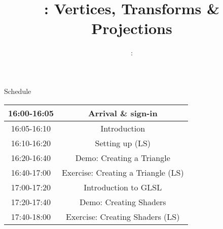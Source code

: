\usepackage{../../beamerthemeFalmouthGamesAcademy}
\usepackage{multimedia}
\graphicspath{ {../../} }




\usepackage[normalem]{ulem}
\usepackage{wasysym}

\usepackage{pdfpages}

\usetikzlibrary{arrows,automata}




\title{\sessionnumber: Vertices, Transforms \& Projections}
\subtitle{\modulecode: \moduletitle}

\frame{\titlepage} 



\begin{frame}{Schedule}
	\begin{center}
		\begin{tabular}{|c c|}
			\hline
			16:00-16:05 & Arrival \& sign-in \\
			\hline
			16:05-16:10 & Introduction \\
			\hline
			16:10-16:20 & Setting up (LS) \\
			\hline
			16:20-16:40 & Demo: Creating a Triangle \\
			16:40-17:00 & Exercise: Creating a Triangle (LS) \\
			\hline
			17:00-17:20 & Introduction to GLSL \\
			\hline
			17:20-17:40 & Demo: Creating Shaders \\
			17:40-18:00 & Exercise: Creating Shaders (LS) \\
			\hline
		\end{tabular}
	\end{center}
\end{frame}






